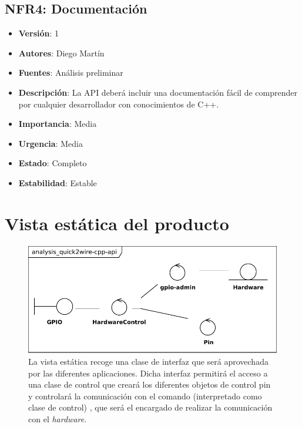 \documentclass[letterpaper,10pt,spanish]{sphinxmanual}
\begin{document}
\section{NFR4: Documentación}
\label{analysis/nfr:nfr4-documentacion}\begin{itemize}
\item {} 
\textbf{Versión}: 1

\item {} 
\textbf{Autores}: Diego Martín

\item {} 
\textbf{Fuentes}: Análisis preliminar

\item {} 
\textbf{Descripción}: La API deberá incluir una documentación fácil de comprender por cualquier desarrollador con conocimientos de C++.

\item {} 
\textbf{Importancia}: Media

\item {} 
\textbf{Urgencia}: Media

\item {} 
\textbf{Estado}: Completo

\item {} 
\textbf{Estabilidad}: Estable

\end{itemize}


\chapter{Vista estática del producto}
\label{analysis/static::doc}\label{analysis/static:vista-estatica-del-producto}\begin{figure}[htbp]
\centering
\capstart

\includegraphics{analysis_quick2wire-cpp-api.pdf}
\caption{La vista estática recoge una clase de interfaz que será aprovechada por las diferentes aplicaciones. Dicha interfaz permitirá el acceso a una clase de control que creará los diferentes objetos de control pin y controlará la comunicación con el comando (interpretado como clase de control) , que será el encargado de realizar la comunicación con el \emph{hardware}.}\end{figure}
\end{document}
